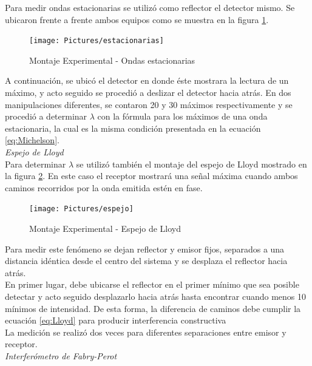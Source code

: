 \documentclass[prb,aps,twocolumn,preprintnumbers,amsmath,amssymb]{revtex4}
\begin{document}
Para medir ondas estacionarias se utilizó como reflector el detector mismo. Se ubicaron frente a frente ambos equipos como se muestra en la figura \ref{fig:estacionarias}. \\

\begin{figure}[h!]
\centering
\texttt{[image: Pictures/estacionarias]}
\caption{Montaje Experimental - Ondas estacionarias}
\label{fig:estacionarias}
\end{figure}

A continuación, se ubicó el detector en donde éste mostrara la lectura de un máximo, y acto seguido se procedió a deslizar el detector hacia atrás. En dos manipulaciones diferentes, se contaron 20 y 30 máximos respectivamente y se procedió a determinar $ \lambda $ con la fórmula para los máximos de una onda estacionaria, la cual es la misma condición presentada en la ecuación \ref{eq:Michelson}. \\ 

\textit{Espejo de Lloyd} \\

Para determinar $ \lambda $ se utilizó también el montaje del espejo de Lloyd mostrado en la figura \ref{fig:espejo}. En este caso el receptor mostrará una señal máxima cuando ambos caminos recorridos por la onda emitida estén en fase. \\

\begin{figure}[h!]
\centering
\texttt{[image: Pictures/espejo]}
\caption{Montaje Experimental - Espejo de Lloyd}
\label{fig:espejo}
\end{figure}

Para medir este fenómeno se dejan reflector y emisor fijos, separados a una distancia idéntica desde el centro del sistema y se desplaza el reflector hacia atrás. \\

En primer lugar, debe ubicarse el reflector en el primer mínimo que sea posible detectar y acto seguido desplazarlo hacia atrás hasta encontrar cuando menos 10 mínimos de intensidad. De esta forma, la diferencia de caminos debe cumplir la ecuación \ref{eq:Lloyd} para producir interferencia constructiva\\

La medición se realizó dos veces para diferentes separaciones entre emisor y receptor.\\


\textit{Interferómetro de Fabry-Perot} \\
\end{document}
